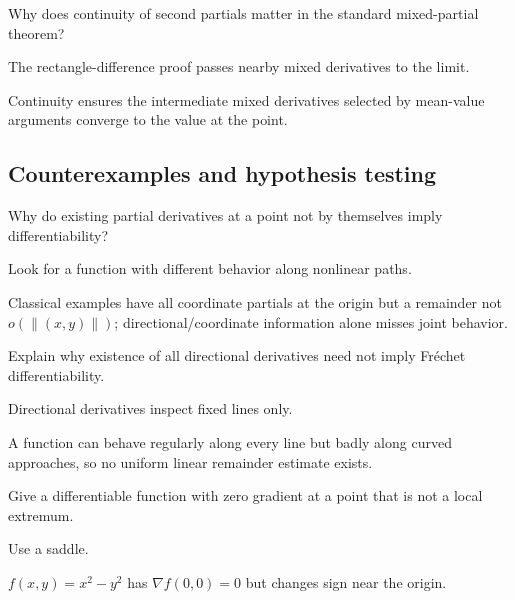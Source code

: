\begin{exercise}\label{exr:ii08-expand-09}
Why does continuity of second partials matter in the standard mixed-partial theorem?
\end{exercise}
\begin{hint}
The rectangle-difference proof passes nearby mixed derivatives to the limit.
\end{hint}
\begin{solution}
Continuity ensures the intermediate mixed derivatives selected by mean-value arguments converge to the value at the point.
\end{solution}

\subsection*{Counterexamples and hypothesis testing}

\begin{exercise}\label{exr:ii08-expand-10}
Why do existing partial derivatives at a point not by themselves imply differentiability?
\end{exercise}
\begin{hint}
Look for a function with different behavior along nonlinear paths.
\end{hint}
\begin{solution}
Classical examples have all coordinate partials at the origin but a remainder not \(o(\|(x,y)\|)\); directional/coordinate information alone misses joint behavior.
\end{solution}

\begin{exercise}\label{exr:ii08-expand-11}
Explain why existence of all directional derivatives need not imply Fréchet differentiability.
\end{exercise}
\begin{hint}
Directional derivatives inspect fixed lines only.
\end{hint}
\begin{solution}
A function can behave regularly along every line but badly along curved approaches, so no uniform linear remainder estimate exists.
\end{solution}

\begin{exercise}\label{exr:ii08-expand-12}
Give a differentiable function with zero gradient at a point that is not a local extremum.
\end{exercise}
\begin{hint}
Use a saddle.
\end{hint}
\begin{solution}
\(f(x,y)=x^2-y^2\) has \(\nabla f(0,0)=0\) but changes sign near the origin.
\end{solution}

